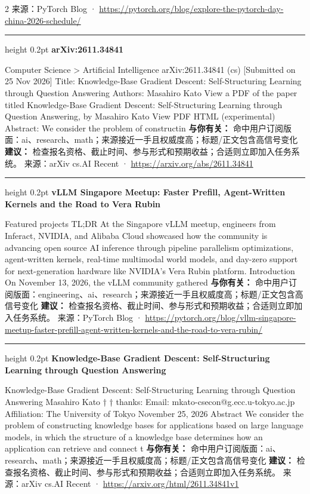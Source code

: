 \documentclass[10.5pt]{ctexart}
\begin{document}
\begin{multicols}{2}
{\footnotesize\color{ormuted} 来源：PyTorch Blog · \url{https://pytorch.org/blog/explore-the-pytorch-day-china-2026-schedule/}}
\vspace{2mm}
\hrule height 0.2pt
\vspace{2mm}
{\large\bfseries arXiv:2611.34841}\par
Computer Science > Artificial Intelligence arXiv:2611.34841 (cs) [Submitted on 25 Nov 2026] Title: Knowledge-Base Gradient Descent: Self-Structuring Learning through Question Answering Authors: Masahiro Kato View a PDF of the paper titled Knowledge-Base Gradient Descent: Self-Structuring Learning through Question Answering, by Masahiro Kato View PDF HTML (experimental) Abstract: We consider the problem of constructin
\textbf{与你有关：} 命中用户订阅版面：ai、research、math；来源接近一手且权威度高；标题/正文包含高信号变化
\textbf{建议：} 检查报名资格、截止时间、参与形式和预期收益；合适则立即加入任务系统。
{\footnotesize\color{ormuted} 来源：arXiv cs.AI Recent · \url{https://arxiv.org/abs/2611.34841}}
\vspace{2mm}
\hrule height 0.2pt
\vspace{2mm}
{\large\bfseries vLLM Singapore Meetup: Faster Prefill, Agent-Written Kernels and the Road to Vera Rubin}\par
Featured projects TL;DR At the Singapore vLLM meetup, engineers from Inferact, NVIDIA, and Alibaba Cloud showcased how the community is advancing open source AI inference through pipeline parallelism optimizations, agent-written kernels, real-time multimodal world models, and day-zero support for next-generation hardware like NVIDIA’s Vera Rubin platform. Introduction On November 13, 2026, the vLLM community gathered
\textbf{与你有关：} 命中用户订阅版面：engineering、ai、research；来源接近一手且权威度高；标题/正文包含高信号变化
\textbf{建议：} 检查报名资格、截止时间、参与形式和预期收益；合适则立即加入任务系统。
{\footnotesize\color{ormuted} 来源：PyTorch Blog · \url{https://pytorch.org/blog/vllm-singapore-meetup-faster-prefill-agent-written-kernels-and-the-road-to-vera-rubin/}}
\vspace{2mm}
\hrule height 0.2pt
\vspace{2mm}
{\large\bfseries Knowledge-Base Gradient Descent: Self-Structuring Learning through Question Answering}\par
Knowledge-Base Gradient Descent: Self-Structuring Learning through Question Answering Masahiro Kato † † thanks: Email: mkato-csecon@g.ecc.u-tokyo.ac.jp Affiliation: The University of Tokyo November 25, 2026 Abstract We consider the problem of constructing knowledge bases for applications based on large language models, in which the structure of a knowledge base determines how an application can retrieve and connect t
\textbf{与你有关：} 命中用户订阅版面：ai、research、math；来源接近一手且权威度高；标题/正文包含高信号变化
\textbf{建议：} 检查报名资格、截止时间、参与形式和预期收益；合适则立即加入任务系统。
{\footnotesize\color{ormuted} 来源：arXiv cs.AI Recent · \url{https://arxiv.org/html/2611.34841v1}}
\end{multicols}
\end{document}
